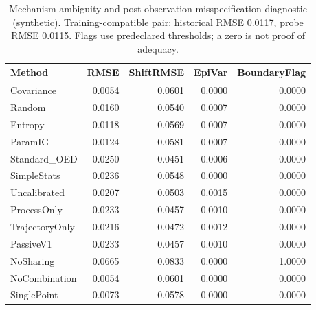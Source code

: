 \begin{table}[t]
\caption{Mechanism ambiguity and post-observation misspecification diagnostic (synthetic). Training-compatible pair: historical RMSE 0.0117, probe RMSE 0.0115. Flags use predeclared thresholds; a zero is not proof of adequacy.}
\label{tab:experiment1}
\begin{tabular}{lrrrr}
\toprule
Method & RMSE & ShiftRMSE & EpiVar & BoundaryFlag \\
\midrule
Covariance & 0.0054 & 0.0601 & 0.0000 & 0.0000 \\
Random & 0.0160 & 0.0540 & 0.0007 & 0.0000 \\
Entropy & 0.0118 & 0.0569 & 0.0007 & 0.0000 \\
ParamIG & 0.0124 & 0.0581 & 0.0007 & 0.0000 \\
Standard\_OED & 0.0250 & 0.0451 & 0.0006 & 0.0000 \\
SimpleStats & 0.0236 & 0.0548 & 0.0000 & 0.0000 \\
Uncalibrated & 0.0207 & 0.0503 & 0.0015 & 0.0000 \\
ProcessOnly & 0.0233 & 0.0457 & 0.0010 & 0.0000 \\
TrajectoryOnly & 0.0216 & 0.0472 & 0.0012 & 0.0000 \\
PassiveV1 & 0.0233 & 0.0457 & 0.0010 & 0.0000 \\
NoSharing & 0.0665 & 0.0833 & 0.0000 & 1.0000 \\
NoCombination & 0.0054 & 0.0601 & 0.0000 & 0.0000 \\
SinglePoint & 0.0073 & 0.0578 & 0.0000 & 0.0000 \\
\bottomrule
\end{tabular}
\end{table}
